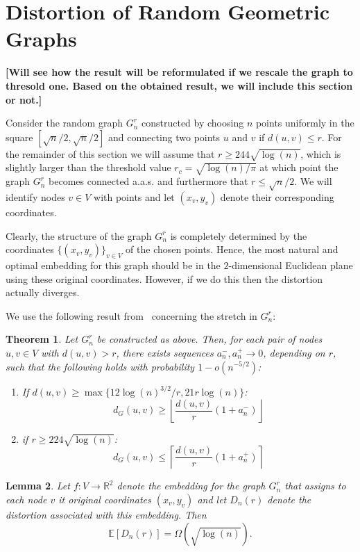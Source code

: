 \documentclass{article} %
\newtheorem{theorem}{Theorem}[section]
\newtheorem{lemma}[theorem]{Lemma}
\begin{document}
\section{Distortion of Random Geometric Graphs}

\textbf{[Will see how the result will be reformulated if we rescale the graph to thresold one. Based on the obtained result, we will include this section or not.]}

Consider the random graph $G_n^r$ constructed by choosing $n$ points uniformly in the square $[\sqrt{n}/2, \sqrt{n}/2]$ and connecting two points $u$ and $v$ if $d(u,v) \le r$. For the remainder of this section we will assume that $r \ge 244 \sqrt{\log(n)}$, which is slightly larger than the threshold value $r_c = \sqrt{\log(n)/\pi}$ at which point the graph $G_n^r$ becomes connected a.a.s. and furthermore that $r \le \sqrt{n}/2$. We will identify nodes $v \in V$ with points and let $(x_v,y_v)$ denote their corresponding coordinates.

Clearly, the structure of the graph $G_n^r$ is completely determined by the coordinates $\{(x_v,y_v)\}_{v \in V}$ of the chosen points. Hence, the most natural and optimal embedding for this graph should be in the $2$-dimensional Euclidean plane using these original coordinates. However, if we do this then the distortion actually diverges.

We use the following result from~\citep{diaz2016relation} concerning the stretch in $G_n^r$:

\begin{theorem}\label{thm:stretch_rgg}
Let $G_n^r$ be constructed as above. Then, for each pair of nodes $u,v \in V$ with $d(u, v) > r$, there exists sequences $a_n^-, a_n^+ \to 0$, depending on $r$, such that the following holds with probability $1 - o(n^{-5/2})$:
\begin{enumerate}
\item If $d(u,v) \ge \max\{12\log(n)^{3/2}/r, 21 r \log(n)\}$:
\[
	d_G(u,v) \ge \left\lfloor \frac{d(u,v)}{r}\left(1 + a_n^-\right)\right\rfloor
\]
\item if $r \ge 224 \sqrt{\log(n)}$:
\[
	d_G(u,v) \le \left\lceil \frac{d(u,v)}{r}\left(1 + a_n^+\right)\right\rceil
\]
\end{enumerate}
\end{theorem}

\begin{lemma}
Let $f : V \to \mathbb{R}^2$ denote the embedding for the graph $G_n^r$ that assigns to each node $v$ it original coordinates $(x_v,y_v)$ and let $D_n(r)$ denote the distortion associated with this embedding. Then
\[
	\mathbb{E}[D_n(r)] = \Omega\left(\sqrt{\log(n)}\right).
\]
\end{lemma}
\end{document}

